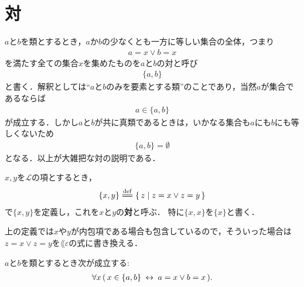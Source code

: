 \section{対}
	$a$と$b$を類とするとき，$a$か$b$の少なくとも一方に等しい集合の全体，つまり
	\begin{align}
		a = x \vee b = x
	\end{align}
	を満たす全ての集合$x$を集めたものを$a$と$b$の対と呼び
	\begin{align}
		\{a,b\}
	\end{align}
	と書く．解釈としては``$a$と$b$のみを要素とする類''のことであり，当然$a$が集合であるならば
	\begin{align}
		a \in \{a,b\}
	\end{align}
	が成立する．しかし$a$と$b$が共に真類であるときは，いかなる集合も$a$にも$b$にも等しくないため
	\begin{align}
		\{a,b\} = \emptyset
	\end{align}
	となる．以上が大雑把な対の説明である．
	
	\begin{screen}
		\begin{dfn}[対]
			$x,y$を$\mathcal{L}$の項とするとき，
			\begin{align}
				\{x,y\} \defeq \Set{z}{z = x \vee z = y}
			\end{align}
			で$\{x,y\}$を定義し，これを$x$と$y$の{\bf 対}と呼ぶ．
			特に$\{x,x\}$を$\{x\}$と書く．
		\end{dfn}
	\end{screen}
	
	上の定義では$x$や$y$が内包項である場合も包含しているので，そういった場合は
	$z = x \vee z = y$を$\lang{\varepsilon}$の式に書き換える．
	
	\begin{screen}
		\begin{thm}[対は表示されている要素しか持たない]
		\label{thm:pair_members_are_exactly_the_given_two}
			$a$と$b$を類とするとき次が成立する:
			\begin{align}
				\forall x\, (\, x \in \{a,b\} \hspace{0.25em}\leftrightarrow\hspace{0.25em} a=x \vee b=x\, ).
			\end{align}
		\end{thm}
	\end{screen}
	

